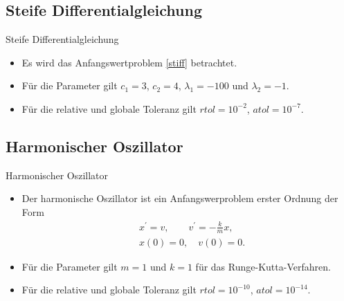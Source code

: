 \subsection{Steife Differentialgleichung}

\begin{frame}{Steife Differentialgleichung}
    \begin{itemize}
        \item<1-> Es wird das Anfangswertproblem \eqref{stiff} betrachtet.
        \item<2-> Für die Parameter gilt $c_1=3$, $c_2=4$, $\lambda_1=-100$ und $\lambda_2=-1$.
        \item<3-> Für die relative und globale Toleranz gilt $rtol=10^{-2}$, $atol=10^{-7}$.
    \end{itemize}
\end{frame}

\subsection{Harmonischer Oszillator}

\begin{frame}{Harmonischer Oszillator}
    \begin{itemize}
        \item<1-> Der harmonische Oszillator ist ein Anfangswerproblem erster Ordnung der Form
        \begin{align*}
            &x^{\prime}=v, \qquad v^{\prime}=-\frac{k}{m}x, \\
            &x(0)=0, \quad v(0)=0.
        \end{align*}
        \item<2-> Für die Parameter gilt $m=1$ und $k=1$ für das Runge-Kutta-Verfahren.
        \item<3-> Für die relative und globale Toleranz gilt $rtol=10^{-10}$, $atol=10^{-14}$.
    \end{itemize}
\end{frame}